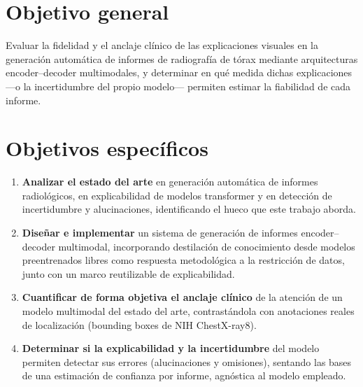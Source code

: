 \section{Objetivo general}
Evaluar la fidelidad y el anclaje clínico de las explicaciones visuales en la generación
automática de informes de radiografía de tórax mediante arquitecturas encoder--decoder
multimodales, y determinar en qué medida dichas explicaciones —o la incertidumbre del propio
modelo— permiten estimar la fiabilidad de cada informe.

\section{Objetivos específicos}
\begin{enumerate}
  \item \textbf{Analizar el estado del arte} en generación automática de informes radiológicos,
  en explicabilidad de modelos transformer y en detección de incertidumbre y alucinaciones,
  identificando el hueco que este trabajo aborda.
  \item \textbf{Diseñar e implementar} un sistema de generación de informes encoder--decoder
  multimodal, incorporando destilación de conocimiento desde modelos preentrenados libres como
  respuesta metodológica a la restricción de datos, junto con un marco reutilizable de
  explicabilidad.
  \item \textbf{Cuantificar de forma objetiva el anclaje clínico} de la atención de un modelo
  multimodal del estado del arte, contrastándola con anotaciones reales de localización
  (bounding boxes de NIH ChestX-ray8).
  \item \textbf{Determinar si la explicabilidad y la incertidumbre} del modelo permiten detectar
  sus errores (alucinaciones y omisiones), sentando las bases de una estimación de confianza por
  informe, agnóstica al modelo empleado.
\end{enumerate}
